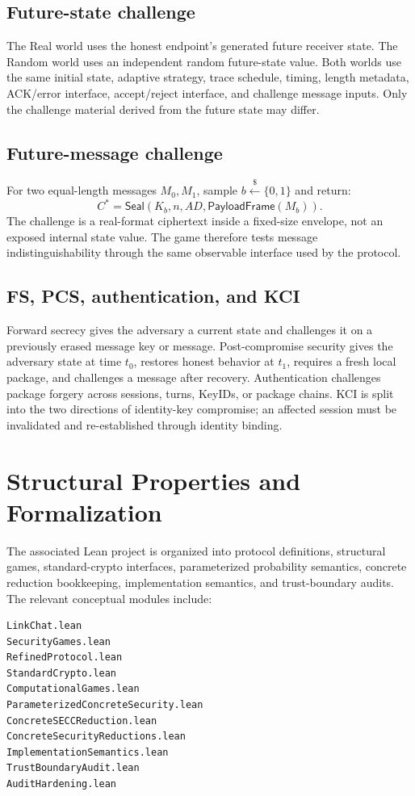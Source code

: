 \documentclass[11pt,letterpaper]{article}
\newcommand{\sample}{\xleftarrow{\$}}
\begin{document}
\subsection{Future-state challenge}

The Real world uses the honest endpoint's generated future receiver state. The Random world
uses an independent random future-state value. Both worlds use the same initial state,
adaptive strategy, trace schedule, timing, length metadata, ACK/error interface,
accept/reject interface, and challenge message inputs. Only the challenge material derived
from the future state may differ.

\subsection{Future-message challenge}

For two equal-length messages $M_0,M_1$, sample $b\sample\{0,1\}$ and return:
\[
  C^*=\mathsf{Seal}(K_b,n,AD,\mathsf{PayloadFrame}(M_b)).
\]
The challenge is a real-format ciphertext inside a fixed-size envelope, not an exposed
internal state value. The game therefore tests message indistinguishability through the
same observable interface used by the protocol.

\subsection{FS, PCS, authentication, and KCI}

Forward secrecy gives the adversary a current state and challenges it on a previously
erased message key or message. Post-compromise security gives the adversary state at time
$t_0$, restores honest behavior at $t_1$, requires a fresh local package, and challenges a
message after recovery. Authentication challenges package forgery across sessions, turns,
KeyIDs, or package chains. KCI is split into the two directions of identity-key
compromise; an affected session must be invalidated and re-established through identity
binding.

\section{Structural Properties and Formalization}
\label{sec:formalization}

The associated Lean project is organized into protocol definitions, structural games,
standard-crypto interfaces, parameterized probability semantics, concrete reduction
bookkeeping, implementation semantics, and trust-boundary audits. The relevant conceptual
modules include:
\begin{lstlisting}[caption={Conceptual organization of the Lean development}]
LinkChat.lean
SecurityGames.lean
RefinedProtocol.lean
StandardCrypto.lean
ComputationalGames.lean
ParameterizedConcreteSecurity.lean
ConcreteSECCReduction.lean
ConcreteSecurityReductions.lean
ImplementationSemantics.lean
TrustBoundaryAudit.lean
AuditHardening.lean
\end{lstlisting}
\end{document}
